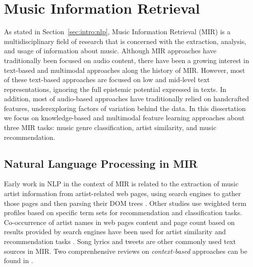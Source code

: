 \section{Music Information Retrieval}
\label{sec:SOA:mir}

As stated in Section~\ref{sec:intro:nlp}, Music Information Retrieval (MIR) is a multidisciplinary field of research that is concerned with the extraction, analysis, and usage of information about music. %
Although MIR approaches have traditionally been focused on audio content, there have been a growing interest in text-based and multimodal approaches along the history of MIR. However, most of these text-based approaches are focused on low and mid-level text representations, ignoring the full epistemic potential expressed in texts. In addition, most of audio-based approaches have traditionally relied on handcrafted features, underexploring factors of variation behind the data.
In this dissertation we focus on knowledge-based and multimodal feature learning approaches about three MIR tasks: music genre classification, artist similarity, and music recommendation.

\subsection{Natural Language Processing in MIR}

Early work in NLP in the context of MIR is related to the extraction of music artist information from artist-related web pages, using search engines to gather those pages and then parsing their DOM trees \cite{Cohen2000}. Other studies \cite{Ellis2002,Whitman2002} use weighted term profiles based on specific term sets for recommendation and classification tasks. 
Co-occurrence of artist names in web pages content and page count based on results provided by search engines have been used for artist similarity and recommendation tasks \cite{Schedl2005}. Song lyrics \cite{} and tweets \cite{Schedl2013a} are other commonly used text sources in MIR. %
Two comprenhensive reviews on \textit{context-based} approaches can be found in \cite{Knees2013, Schedl2014}.

